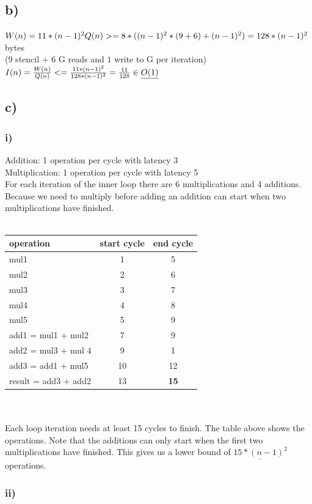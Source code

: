 \documentclass[10pt,a4paper,oneside,notitlepage]{report}
\begin{document}
\subsection*{b)}
$W(n) = 11*(n-1)^2 \\
Q(n) >= 8*((n-1)^2*(9 + 6) + (n-1)^2 ) = 128*(n-1)^2$  bytes \\($9$ stencil + $6$ G reads and $1$ write to G per iteration) \\
$I(n) = {W(n) \over Q(n)} <= {11*(n-1)^2 \over 128*(n-1)^2} = {11 \over 128} \in \underline{O(1)}$
\subsection*{c)}
\subsubsection*{i)}
Addition: 1 operation per cycle with latency 3 \\
Multiplication: 1 operation per cycle with latency 5 \\
For each iteration of the inner loop there are 6 multiplications and 4 additions. Because we need to multiply before adding an addition can start when two multiplications have finished.  \\ \\
\begin{tabular}{|l|c|c|}
\hline 
\rowcolor{gray!30}
operation & start cycle & end cycle \\ 
\hline 
mul1 & 1 & 5 \\ 
\hline 
mul2 & 2 & 6 \\ 
\hline 
mul3 & 3 & 7 \\ 
\hline 
mul4 & 4 & 8 \\ 
\hline 
mul5 & 5 & 9 \\ 
\hline 
add1 = mul1 + mul2 & 7 & 9 \\ 
\hline 
add2 = mul3 + mul 4 & 9 & 1 \\ 
\hline 
add3 = add1 + mul5 & 10 & 12 \\ 
\hline 
result = add3 + add2 & 13 & \textbf{15} \\ 
\hline 
\end{tabular}  \\ \\
Each loop iteration needs at least 15 cycles to finish. The table above shows the operations. Note that the additions can only start when the first two multiplications have finished. This gives us a lower bound of $\underline{15*(n-1)^2}$ operations.
\subsubsection*{ii)}
\end{document}
